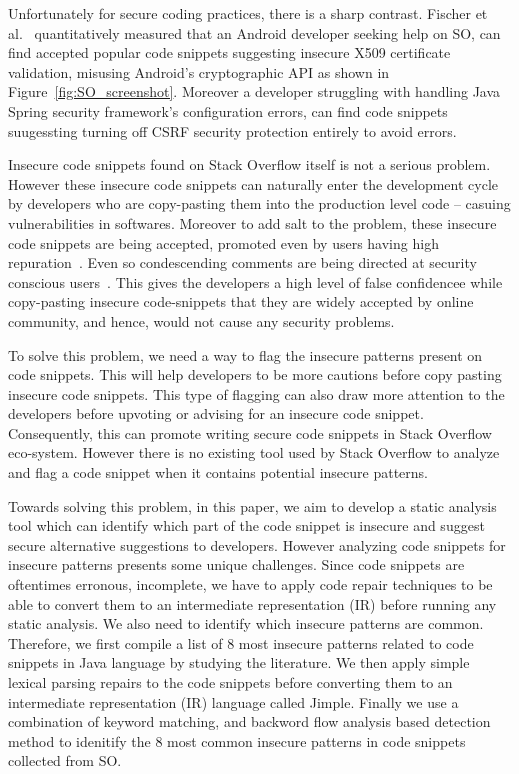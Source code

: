    Unfortunately for secure coding practices, there is a sharp contrast. Fischer et al.~\cite{fischer2017stack} quantitatively measured that an Android developer seeking help on SO, can find accepted popular code snippets suggesting insecure X509 certificate validation, misusing Android’s cryptographic API  as shown in Figure~\ref{fig:SO_screenshot}. Moreover a developer struggling with handling Java Spring security framework's configuration errors, can find code snippets suugessting turning off CSRF security protection entirely to avoid errors. 
   
   Insecure code snippets found on Stack Overflow itself is not a serious problem. However 
   these insecure code snippets can  naturally enter the development cycle by developers who are copy-pasting them into the production level code -- casuing vulnerabilities in softwares.
   Moreover to add salt to the problem, these insecure code snippets are being accepted, promoted even by users having high repuration~\cite{meng2018secure}.
   Even so condescending comments are being directed at security conscious users~\cite{java-so-cyber-bullying}. 
   This gives the developers a high level of false confidencee while copy-pasting insecure code-snippets that they are widely accepted by online community, and hence, would not cause any security problems. 

   
   
   To solve this problem, we need a way to flag the insecure patterns present on code snippets. 
   This will help developers to be more cautions before copy pasting insecure code snippets. This type of flagging can also draw more attention to the developers before upvoting or advising for an insecure code snippet. Consequently, this can promote writing secure code snippets in Stack Overflow eco-system.
   However there is no existing tool used by Stack Overflow to analyze and flag a code snippet when it contains potential insecure patterns.
   
   Towards solving this problem, in this paper, we aim to develop a static analysis tool  which can identify which part of the code snippet is insecure and suggest secure alternative suggestions to developers. However analyzing code snippets for insecure patterns presents some unique challenges. Since  code snippets are
   oftentimes erronous, incomplete, we have to apply code repair techniques to be able to convert them to an intermediate representation (IR) before running any static analysis. We also need to identify which insecure patterns are common.%
   Therefore, we first compile a list of 8 most insecure patterns related to code snippets in Java language by studying the literature. We then apply simple lexical parsing repairs to the code snippets before converting them to an intermediate representation (IR) language called Jimple. Finally we use a combination of keyword matching, and backword flow analysis based detection method to idenitify the 8 most common insecure patterns in code snippets collected from SO.
   
